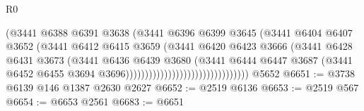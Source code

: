 \begin{lexlean}{R0}
\begin{coremodule}
                                                  (@3441
                                                    @6388
                                                    @6391
                                                    @3638
                                                    (@3441
                                                      @6396
                                                      @6399
                                                      @3645
                                                      (@3441
                                                        @6404
                                                        @6407
                                                        @3652
                                                        (@3441
                                                          @6412
                                                          @6415
                                                          @3659
                                                          (@3441
                                                            @6420
                                                            @6423
                                                            @3666
                                                            (@3441
                                                              @6428
                                                              @6431
                                                              @3673
                                                              (@3441
                                                                @6436
                                                                @6439
                                                                @3680
                                                                (@3441
                                                                  @6444
                                                                  @6447
                                                                  @3687
                                                                  (@3441
                                                                    @6452
                                                                    @6455
                                                                    @3694
                                                                    @3696))))))))))))))))))))))))))))))))
    @5652
@6651 := @3738 @6139 @146 @1387 @2630 @2627
@6652 := @2519 @6136
@6653 := @2519 @567
@6654 := @6653 @2561
@6683 := @6651

\end{coremodule}
\end{lexlean}
